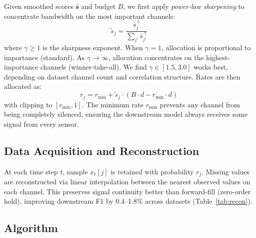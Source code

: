 \documentclass[journal]{IEEEtran}
\begin{document}
Given smoothed scores $\bar{\mathbf{s}}$ and budget $B$, we first apply \textit{power-law sharpening} to concentrate bandwidth on the most important channels:
\begin{equation}
\tilde{s}_j = \frac{\bar{s}_j^{\,\gamma}}{\sum_{j'} \bar{s}_{j'}^{\,\gamma}}
\label{eq:sharpening}
\end{equation}
where $\gamma \geq 1$ is the sharpness exponent. When $\gamma = 1$, allocation is proportional to importance (standard). As $\gamma \to \infty$, allocation concentrates on the highest-importance channels (winner-take-all). We find $\gamma \in [1.5, 3.0]$ works best, depending on dataset channel count and correlation structure. Rates are then allocated as:
\begin{equation}
r_j = r_{\min} + \tilde{s}_j \cdot (B \cdot d - r_{\min} \cdot d)
\label{eq:allocation}
\end{equation}
with clipping to $[r_{\min}, 1]$. The minimum rate $r_{\min}$ prevents any channel from being completely silenced, ensuring the downstream model always receives some signal from every sensor.

\subsection{Data Acquisition and Reconstruction}

At each time step $t$, sample $x_t[j]$ is retained with probability $r_j$. Missing values are reconstructed via linear interpolation between the nearest observed values on each channel. This preserves signal continuity better than forward-fill (zero-order hold), improving downstream F1 by 0.4--1.8\% across datasets (Table~\ref{tab:recon}).

\subsection{Algorithm}
\end{document}
